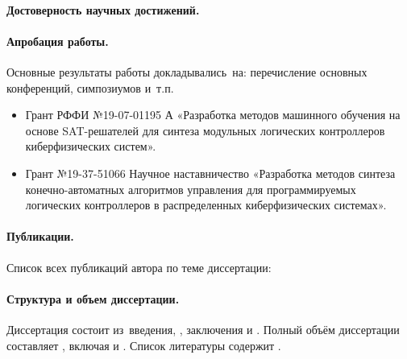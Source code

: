 \paragraph*{Достоверность научных достижений.}



\paragraph*{Апробация работы.}
%
 Основные результаты работы докладывались~на: перечисление основных конференций, симпозиумов и~т.\:п.

\begin{itemize}
    \item Грант РФФИ №19-07-01195 А «Разработка методов машинного
    обучения на основе SAT-решателей для синтеза модульных логических контроллеров киберфизических систем».
    \item Грант №19-37-51066 Научное наставничество «Разработка методов синтеза конечно-автоматных алгоритмов управления для программируемых логических контроллеров в распределенных киберфизических системах».
\end{itemize}




\paragraph*{Публикации.}
%
Список всех публикаций автора по теме диссертации:
%
\begin{refsection}
\nocite{*}
\printbibliography[
    keyword=own,
    heading=none,
    resetnumbers=true
]
\end{refsection}



\paragraph*{Структура и объем диссертации.}
%
Диссертация состоит из~введения,
,
заключения и
.
Полный объём диссертации составляет
, включая
 и
.
Список литературы содержит
.

